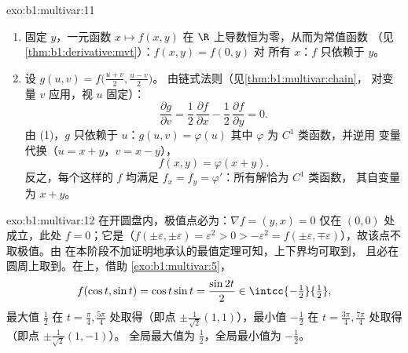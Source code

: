 \begin{solution}{exo:b1:multivar:11}
\begin{enumerate}
  \item 固定 $y$，一元函数 $x \mapsto
        f(x,y)$ 在 $\R$ 上导数恒为零，从而为常值函数
        （见\cref{thm:b1:derivative:mvt}）：$f(x, y) = f(0, y)$ 对
        所有 $x$：$f$ 只依赖于 $y$。
  \item 设 $g(u, v) = f\bigl(\frac{u+v}2, \frac{u-v}2\bigr)$。
        由链式法则（见\cref{thm:b1:multivar:chain}，
        对变量 $v$ 应用，视 $u$ 固定）：
        \[
        \frac{\partial g}{\partial v}
        = \frac12\,\frac{\partial f}{\partial x}
        - \frac12\,\frac{\partial f}{\partial y} = 0 .
        \]
        由 (1)，$g$ 只依赖于 $u$：$g(u, v) = \varphi(u)$
        其中 $\varphi$ 为 $C^1$ 类函数，并逆用
        变量代换（$u = x + y$，$v = x - y$），
        \[
        f(x, y) = \varphi(x + y).
        \]
        反之，每个这样的 $f$ 均满足 $f_x = f_y =
        \varphi'$：所有解恰为 $C^1$ 类函数，
        其自变量为 $x + y$。
\end{enumerate}
\end{solution}

\begin{solution}{exo:b1:multivar:12}
在开圆盘内，极值点必为：$\nabla f = (y,
x) = 0$ 仅在 $(0,0)$ 处成立，此处 $f = 0$；它是（$f(\pm
\varepsilon, \pm\varepsilon) = \varepsilon^2 > 0 > -\varepsilon^2
= f(\pm\varepsilon, \mp\varepsilon)$），故该点不取极值。由
在本阶段不加证明地承认的最值定理可知，上下界均可取到，
且必在圆周上取到。在上，借助
\cref{exo:b1:multivar:5}，
\[
f(\cos t, \sin t) = \cos t\sin t = \frac{\sin 2t}{2}
\in \intcc{-\tfrac12}{\tfrac12},
\]
最大值 $\frac12$ 在 $t = \frac\pi4, \frac{5\pi}4$ 处取得（即点
$\pm\frac{1}{\sqrt2}(1,1)$），最小值 $-\frac12$ 在 $t =
\frac{3\pi}4, \frac{7\pi}4$ 处取得（即点 $\pm\frac{1}{\sqrt2}(1,-1)$）。
全局最大值为 $\frac12$，全局最小值为 $-\frac12$。
\end{solution}

